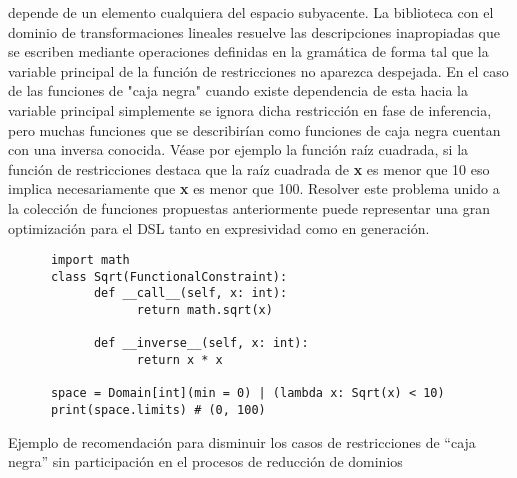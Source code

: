 \begin{recomendations}
\begin{enumerate}
              depende de un elemento cualquiera del espacio subyacente. La biblioteca con el dominio de
              transformaciones lineales resuelve las descripciones inapropiadas que se escriben mediante
              operaciones definidas en la gramática de forma tal que la variable principal de la función de
              restricciones no aparezca despejada. En el caso de las funciones de "caja negra" cuando existe
              dependencia de esta hacia la variable principal simplemente se ignora dicha restricción en
              fase de inferencia, pero muchas funciones que se describirían como funciones de caja negra
              cuentan con una inversa conocida. Véase por ejemplo la función raíz cuadrada, si la función de
              restricciones destaca que la raíz cuadrada de {\bf x} es menor que 10 eso implica necesariamente
              que {\bf x} es menor que 100. Resolver este problema unido a la colección de funciones propuestas
              anteriormente puede representar una gran optimización para el DSL tanto en expresividad como en
              generación.

              \begin{listing}[!ht]
                  \begin{verbatim}
      import math
      class Sqrt(FunctionalConstraint):
            def __call__(self, x: int):
                  return math.sqrt(x)

            def __inverse__(self, x: int):
                  return x * x

      space = Domain[int](min = 0) | (lambda x: Sqrt(x) < 10)
      print(space.limits) # (0, 100)
                  \end{verbatim}
                  \caption{Ejemplo de recomendación para disminuir los casos de restricciones de ``caja negra'' sin participación en el procesos de reducción de dominios}
              \end{listing}


\end{enumerate}
\end{recomendations}
